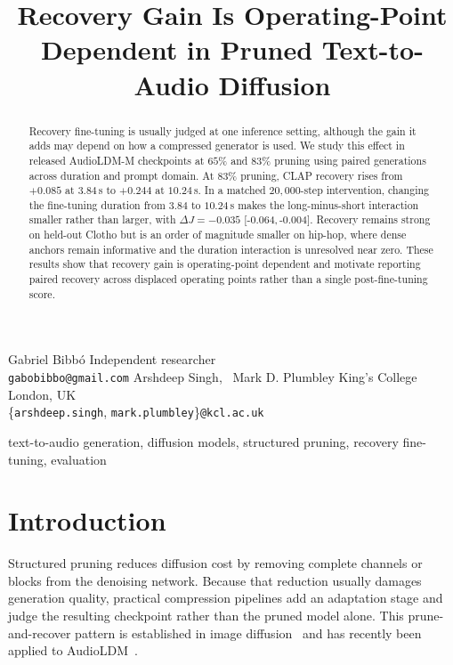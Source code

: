 \documentclass{article}
\newcommand{\ci}[2]{[{#1},\,{#2}]}
\begin{document}
\ninept

\title{Recovery Gain Is Operating-Point Dependent in Pruned Text-to-Audio Diffusion}

\twoauthors
  {Gabriel Bibb\'o}
  {Independent researcher \\
   \texttt{gabobibbo@gmail.com}}
  {Arshdeep Singh, \, Mark D. Plumbley}
  {King's College London, UK \\
   \{\texttt{arshdeep.singh}, \texttt{mark.plumbley}\}\texttt{@kcl.ac.uk}}

\maketitle

\begin{abstract}
Recovery fine-tuning is usually judged at one inference setting, although the gain it adds may depend on how a compressed generator is used. We study this effect in released AudioLDM-M checkpoints at $65\%$ and $83\%$ pruning using paired generations across duration and prompt domain. At $83\%$ pruning, CLAP recovery rises from $+0.085$ at $3.84$\,s to $+0.244$ at $10.24$\,s. In a matched $20{,}000$-step intervention, changing the fine-tuning duration from $3.84$ to $10.24$\,s makes the long-minus-short interaction smaller rather than larger, with $\Delta J=-0.035$ \ci{-0.064}{-0.004}. Recovery remains strong on held-out Clotho but is an order of magnitude smaller on hip-hop, where dense anchors remain informative and the duration interaction is unresolved near zero. These results show that recovery gain is operating-point dependent and motivate reporting paired recovery across displaced operating points rather than a single post-fine-tuning score.
\end{abstract}

\begin{keywords}
text-to-audio generation, diffusion models, structured pruning, recovery fine-tuning, evaluation
\end{keywords}

\section{Introduction}
Structured pruning reduces diffusion cost by removing complete channels or blocks from the denoising network. Because that reduction usually damages generation quality, practical compression pipelines add an adaptation stage and judge the resulting checkpoint rather than the pruned model alone. This prune-and-recover pattern is established in image diffusion~\cite{fang2023diffpruning,kim2024bksdm,fang2025tinyfusion} and has recently been applied to AudioLDM~\cite{singh2026pruning}.
\end{document}
